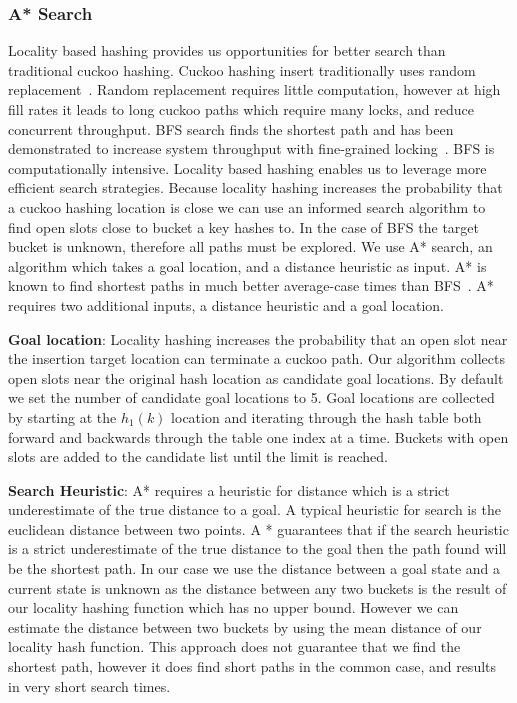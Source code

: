 \subsubsection{A* Search} 

Locality based hashing provides us opportunities for better
search than traditional cuckoo hashing. Cuckoo hashing
insert traditionally uses random replacement~\cite{cuckoo}.
Random replacement requires little computation, however at
high fill rates it leads to long cuckoo paths which require
many locks, and reduce concurrent throughput. BFS search
finds the shortest path and has been demonstrated to
increase system throughput with fine-grained
locking~\cite{cuckoo-improvements}.  BFS is computationally
intensive. Locality based hashing enables us to leverage
more efficient search strategies. Because locality hashing
increases the probability that a cuckoo hashing location is
close we can use an informed search algorithm to find open
slots close to bucket a key hashes to. 
In the case of BFS the target bucket is unknown, therefore
all paths must be explored. We use A* search, an algorithm
which takes a goal location, and a distance heuristic as
input. A* is known to find shortest paths in much better
average-case times than BFS~\cite{}. A* requires two
additional inputs, a distance heuristic and a goal location.

\textbf{Goal location}: Locality hashing increases the
probability that an open slot near the insertion target
location can terminate a cuckoo path. Our algorithm collects
open slots near the original hash location as candidate goal
locations. By default we set the number of candidate goal
locations to 5. Goal locations are collected by starting at
the $h_1(k)$ location and iterating through the hash
table both forward and backwards through the table one index
at a time. Buckets with open slots are added to the
candidate list until the limit is reached. 


\textbf{Search Heuristic}: A* requires a heuristic for
distance which is a strict underestimate of the true
distance to a goal. A typical heuristic for search is the
euclidean distance between two points. A * guarantees that
if the search heuristic is a strict underestimate of the
true distance to the goal then the path found will be the
shortest path. In our case we use the distance between a
goal state and a current state is unknown as the distance
between any two buckets is the result of our locality
hashing function which has no upper bound. However we can
estimate the distance between two buckets by using the mean
distance of our locality hash function. This approach does
not guarantee that we find the shortest path, however it
does find short paths in the common case, and results in
very short search times.